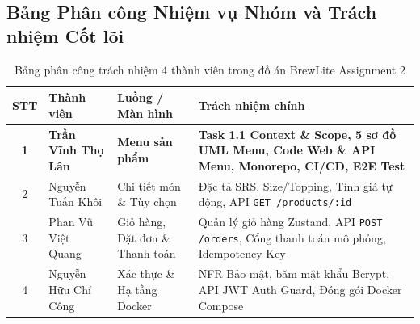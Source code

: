 \documentclass[a4paper]{article}
\begin{document}
\subsection{Bảng Phân công Nhiệm vụ Nhóm và Trách nhiệm Cốt lõi}

\begin{table}[H]
\centering
\small
\begin{tabularx}{\textwidth}{|c|>{\raggedright\arraybackslash}p{3.8cm}|>{\raggedright\arraybackslash}p{3.5cm}|>{\raggedright\arraybackslash}X|}
\hline
\textbf{STT} & \textbf{Thành viên} & \textbf{Luồng / Màn hình} & \textbf{Trách nhiệm chính} \\ \hline
\textbf{1} & \textbf{Trần Vĩnh Thọ Lân} & \textbf{Menu sản phẩm} & \textbf{Task 1.1 Context \& Scope, 5 sơ đồ UML Menu, Code Web \& API Menu, Monorepo, CI/CD, E2E Test} \\ \hline
2 & Nguyễn Tuấn Khôi & Chi tiết món \& Tùy chọn & Đặc tả SRS, Size/Topping, Tính giá tự động, API \texttt{GET /products/:id} \\ \hline
3 & Phan Vũ Việt Quang & Giỏ hàng, Đặt đơn \& Thanh toán & Quản lý giỏ hàng Zustand, API \texttt{POST /orders}, Cổng thanh toán mô phỏng, Idempotency Key \\ \hline
4 & Nguyễn Hữu Chí Công & Xác thực \& Hạ tầng Docker & NFR Bảo mật, băm mật khẩu Bcrypt, API JWT Auth Guard, Đóng gói Docker Compose \\ \hline
\end{tabularx}
\caption{Bảng phân công trách nhiệm 4 thành viên trong đồ án BrewLite Assignment 2}
\label{tab:team_roles}
\end{table}
\end{document}
